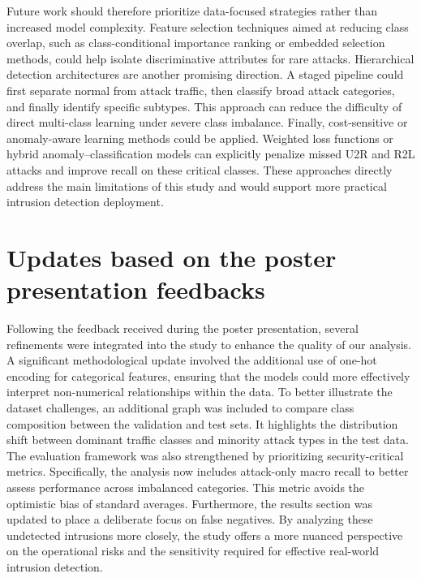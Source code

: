 Future work should therefore prioritize data-focused strategies rather than increased model complexity. Feature selection techniques aimed at reducing class overlap, 
such as class-conditional importance ranking or embedded selection methods, could help isolate discriminative attributes for rare attacks. Hierarchical detection architectures 
are another promising direction. A staged pipeline could first separate normal from attack traffic, then classify broad attack categories, and finally identify specific subtypes. 
This approach can reduce the difficulty of direct multi-class learning under severe class imbalance. Finally, cost-sensitive or anomaly-aware learning methods could be applied. 
Weighted loss functions or hybrid anomaly--classification models can explicitly penalize missed U2R and R2L attacks and improve recall on these critical classes. These approaches 
directly address the main limitations of this study and would support more practical intrusion detection deployment.

\section{Updates based on the poster presentation feedbacks}

Following the feedback received during the poster presentation, several refinements were integrated into the study to enhance the quality of our analysis. A significant 
methodological update involved the additional use of one-hot encoding for categorical features, ensuring that the models could more effectively interpret non-numerical relationships 
within the data. To better illustrate the dataset challenges, an additional graph was included to compare class composition between the validation and test sets. It highlights the distribution shift between dominant traffic classes and minority attack types in the test data. 
The evaluation framework was also strengthened by prioritizing security-critical metrics. Specifically, the analysis now includes attack-only macro recall to better assess performance across imbalanced categories. This metric avoids the optimistic bias of standard averages. Furthermore, the results section was updated to 
place a deliberate focus on false negatives. By analyzing these undetected intrusions more closely, the study offers a more nuanced perspective on the operational risks and the 
sensitivity required for effective real-world intrusion detection.